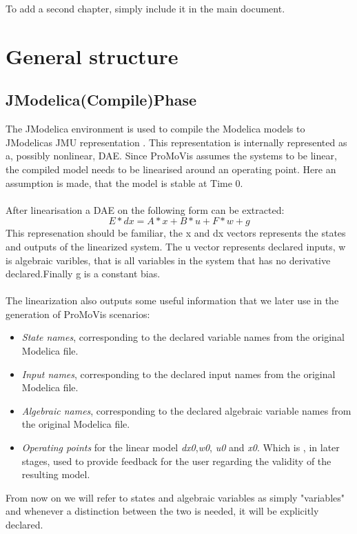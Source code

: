 To add a second chapter, simply include it in the main document.

\section{General structure}
\subsection{JModelica(Compile)Phase}
The JModelica environment is used to compile the Modelica models to JModelicas JMU representation \cite{jmodelicaorg}\nocite{*}. This representation is internally represented as a, possibly nonlinear, DAE. Since ProMoVis assumes the systems to be linear, the compiled model needs to be linearised around an operating point. Here an assumption is made, that the model is stable at Time 0.\\\\After linearisation a DAE on the following form can be extracted:
\begin{equation}
E*dx = A*x + B*u + F*w + g
\end{equation}
This represenation should be familiar, the x and dx vectors represents the states and outputs of the linearized system. The u vector represents declared inputs, w is algebraic varibles, that is all variables in the system that has no derivative declared.Finally g is a constant bias.\\\\The linearization also outputs some useful information that we later use in the generation of ProMoVis scenarios:
\begin{itemize}
\item \textit{State names}, corresponding to the declared variable names from the original Modelica file.
\item \textit{Input names}, corresponding to the declared input names from the original Modelica file.
\item \textit{Algebraic names}, corresponding to the declared algebraic variable names from the original Modelica file.
\item \textit{Operating points} for the linear model \textit{dx0},\textit{w0}, \textit{u0} and \textit{x0}. Which is , in later stages, used to provide feedback for the user regarding the validity of the resulting model.
\end{itemize}
From now on we will refer to states and algebraic variables as simply "variables" and whenever a distinction between the two is needed, it will be explicitly declared. 

